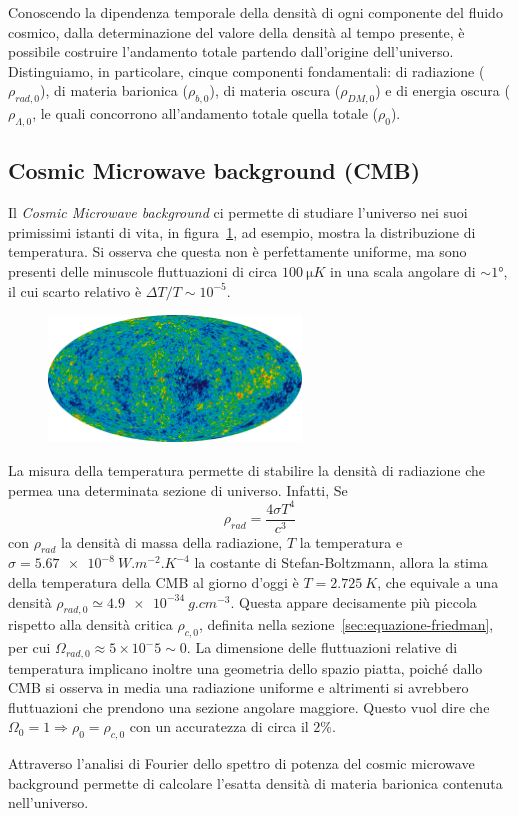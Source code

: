 Conoscendo la dipendenza temporale della densità di ogni componente del fluido cosmico, dalla determinazione del valore della densità al tempo presente, è possibile costruire l'andamento totale partendo dall'origine dell'universo. Distinguiamo, in particolare, cinque componenti fondamentali: di radiazione ($\rho_{rad, 0}$), di materia barionica ($\rho_{b, 0}$), di materia oscura ($\rho_{DM, 0}$) e di energia oscura ($\rho_{\Lambda, 0}$, le quali concorrono all'andamento totale quella totale ($\rho_{0}$).

\subsection{Cosmic Microwave background (CMB)}\label{sec:CMB}
Il \textit{Cosmic Microwave background} ci permette di studiare l'universo nei suoi primissimi istanti di vita, in figura~\ref{fig:CMB1}, ad esempio, mostra la distribuzione di temperatura. Si osserva che questa non è perfettamente uniforme, ma sono presenti delle minuscole fluttuazioni di circa $\SI{100}{\micro K}$ in una scala angolare di $\sim 1\si{\degree}$, il cui scarto relativo è $\Delta T/T \sim 10^{-5}$.
\begin{figure}
    \centering
    \includegraphics[width = 0.6\textwidth]{immagini/CMB1.png}
    \caption{}\label{fig:CMB1}
\end{figure}

La misura della temperatura permette di stabilire la densità di radiazione che permea una determinata sezione di universo. Infatti, Se
\[
    \rho_{rad} = \frac{4\sigma T^4}{c^3}
\]
con $\rho_{rad}$ la densità di massa della radiazione, $T$ la temperatura e $\sigma = \SI{5.67e-8}{W.m^{-2}.K^{-4}}$ la costante di Stefan-Boltzmann, allora la stima della temperatura della CMB al giorno d'oggi è $T=\SI{2.725}{K}$, che equivale a una densità $\rho_{rad, 0} \simeq \SI{4.9e-34}{g.cm^{-3}}$. Questa appare decisamente più piccola rispetto alla densità critica $\rho_{c,0}$, definita nella sezione~\ref{sec:equazione-friedman}, per cui $\Omega_{rad,0} \approx 5\times 10^-5 \sim 0$. La dimensione delle fluttuazioni relative di temperatura implicano inoltre una geometria dello spazio piatta, poiché dallo CMB si osserva in media una radiazione uniforme e altrimenti si avrebbero fluttuazioni che prendono una sezione angolare maggiore. Questo vuol dire che $\Omega_0 = 1 \Rightarrow \rho_0 = \rho_{c,0}$ con un accuratezza di circa il $2\%$.

Attraverso l'analisi di Fourier dello spettro di potenza del cosmic microwave background permette di calcolare l'esatta densità di materia barionica contenuta nell'universo.